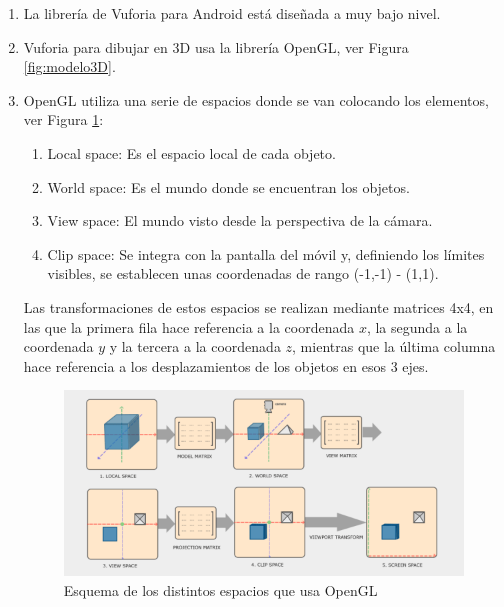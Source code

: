 \begin{enumerate}
    \item La librería de Vuforia para Android está diseñada a muy bajo nivel.
    \item Vuforia para dibujar en 3D usa la librería OpenGL, ver Figura \ref{fig:modelo3D}.
    \item OpenGL utiliza una serie de espacios donde se van colocando los elementos, ver Figura \ref{fig:esquemaOpenGl}: 
    \begin{enumerate}
        \item Local space: Es el espacio local de cada objeto.
        \item World space: Es el mundo donde se encuentran los objetos.
        \item View space: El mundo visto desde la perspectiva de la cámara.
        \item Clip space: Se integra con la pantalla del móvil y, definiendo los límites visibles, se establecen unas coordenadas de rango (-1,-1) - (1,1).
    \end{enumerate}
    
        Las transformaciones de estos espacios se realizan mediante matrices 4x4, 
        en las que la primera fila hace referencia a la coordenada $x$, la segunda a la coordenada $y$ y la 
        tercera a la coordenada $z$, mientras que la última columna hace referencia a los desplazamientos 
        de los objetos en esos 3 ejes.
            \begin{figure}[H]
                \centering
                \includegraphics[width=5in]{figures/space-transformation.png}
                \caption{Esquema de los distintos espacios que usa OpenGL\cite{spaceopengl}}
                \label{fig:esquemaOpenGl}
            \end{figure}



\end{enumerate}

